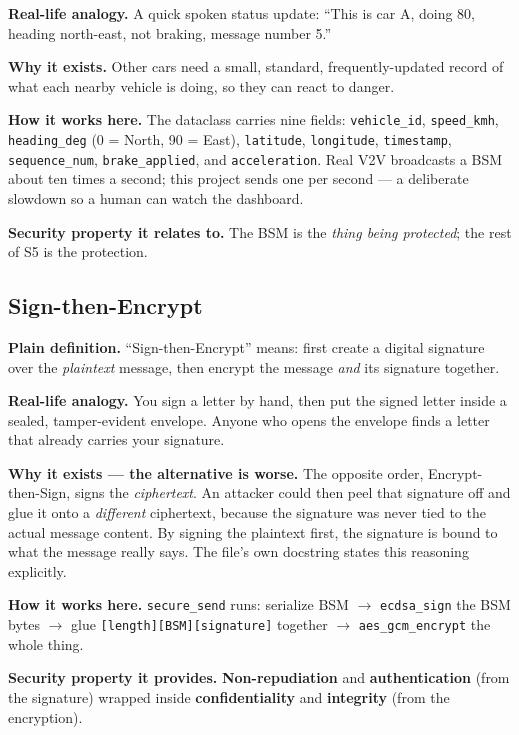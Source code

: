 \documentclass[11pt,a4paper]{article}
\begin{document}
\textbf{Real-life analogy.} A quick spoken status update: ``This is car A, doing
80, heading north-east, not braking, message number 5.''

\textbf{Why it exists.} Other cars need a small, standard, frequently-updated
record of what each nearby vehicle is doing, so they can react to danger.

\textbf{How it works here.} The dataclass carries nine fields:
\texttt{vehicle\_id}, \texttt{speed\_kmh}, \texttt{heading\_deg} (0 = North,
90 = East), \texttt{latitude}, \texttt{longitude}, \texttt{timestamp},
\texttt{sequence\_num}, \texttt{brake\_applied}, and \texttt{acceleration}.
Real V2V broadcasts a BSM about ten times a second; this project sends one per
second --- a deliberate slowdown so a human can watch the dashboard.

\textbf{Security property it relates to.} The BSM is the \emph{thing being
protected}; the rest of S5 is the protection.

\subsection{Sign-then-Encrypt}
\textbf{Plain definition.} ``Sign-then-Encrypt'' means: first create a digital
signature over the \emph{plaintext} message, then encrypt the message
\emph{and} its signature together.

\textbf{Real-life analogy.} You sign a letter by hand, then put the signed letter
inside a sealed, tamper-evident envelope. Anyone who opens the envelope finds a
letter that already carries your signature.

\textbf{Why it exists --- the alternative is worse.} The opposite order,
Encrypt-then-Sign, signs the \emph{ciphertext}. An attacker could then peel that
signature off and glue it onto a \emph{different} ciphertext, because the
signature was never tied to the actual message content. By signing the plaintext
first, the signature is bound to what the message really says. The file's own
docstring states this reasoning explicitly.

\textbf{How it works here.} \texttt{secure\_send} runs: serialize BSM
$\rightarrow$ \texttt{ecdsa\_sign} the BSM bytes $\rightarrow$ glue
\texttt{[length][BSM][signature]} together $\rightarrow$ \texttt{aes\_gcm\_encrypt}
the whole thing.

\textbf{Security property it provides.} \textbf{Non-repudiation} and
\textbf{authentication} (from the signature) wrapped inside
\textbf{confidentiality} and \textbf{integrity} (from the encryption).
\end{document}
